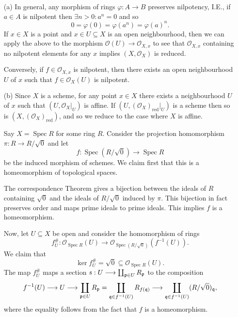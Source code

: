 \documentclass[12pt]{article}
\numberwithin{thm}{subsection}
\numberwithin{defn}{subsection}
\numberwithin{lemma}{subsection}
\numberwithin{example}{subsection}
\numberwithin{notation}{subsection}
\numberwithin{cor}{subsection}
\numberwithin{remark}{subsection}
\numberwithin{condition}{subsection}
\numberwithin{question}{subsection}
\numberwithin{construction}{subsection}
\numberwithin{construction}{subsection}
\numberwithin{construction}{subsection}
\newcommand{\lto}{\longrightarrow}
\begin{document}
\begin{enumerate}
    \item[(a)] In general, any morphism of rings $\varphi: A \lto B$ preserves nilpotency, I.E., if $a \in A$ is nilpotent then $\exists n >0: a^n = 0$ and so
    \begin{equation}
        0 = \varphi(0) = \varphi(a^n) = \varphi(a)^n.
    \end{equation}
    If $x \in X$ is a point and $x \in U \subseteq X$ is an open neighbourhood, then we can apply the above to the morphism $\mathcal{O}(U) \lto \mathcal{O}_{X,x}$ to see that $\mathcal{O}_{X,x}$ containing no nilpotent elements for any $x$ implies $(X, \mathcal{O}_X)$ is reduced.

    Conversely, if $f \in \mathcal{O}_{X,x}$ is nilpotent, then there exists an open neighbourhood $U$ of $x$ such that $f \in \mathcal{O}_X(U)$ is nilpotent.
    \item[(b)] Since $X$ is a scheme, for any point $x \in X$ there exists a neighbourhood $U$ of $x$ such that $(U, \mathcal{O}_X\vert_U)$ is affine. If $(U, (\mathcal{O}_X)_{\text{red}}\vert_U)$ is a scheme then so is $(X, (\mathcal{O}_X)_{\text{red}})$, and so we reduce to the case where $X$ is affine.

    Say $X = \operatorname{Spec}R$ for some ring $R$. Consider the projection homomorphism $\pi: R \lto R/\sqrt{0}$ and let
    \begin{equation}
        f: \operatorname{Spec}(R/\sqrt{0}) \lto \operatorname{Spec}R
    \end{equation}
    be the induced morphism of schemes. We claim first that this is a homeomorphism of topological spaces.

    The correspondence Theorem gives a bijection between the ideals of $R$ containing $\sqrt{0}$ and the ideals of $R/\sqrt{0}$ induced by $\pi$. This bijection in fact preserves order and maps prime ideals to prime ideals. This implies $f$ is a homeomorphism.

    Now, let $U \subseteq X$ be open and consider the homomorphism of rings
    \begin{equation}
        f^{\#}_U: \mathcal{O}_{\operatorname{Spec}R}(U) \lto \mathcal{O}_{\operatorname{Spec}(R/\sqrt{0})}(f^{-1}(U)).
    \end{equation}
    We claim that 
    \begin{equation}
        \ker f^{\#}_U = \sqrt{0} \subseteq \mathcal{O}_{\operatorname{Spec}R}(U).
    \end{equation}
    The map $f^{\#}_U$ maps a section $s: U \lto \coprod_{\frak{p} \in U}R_{\frak{p}}$ to the composition
    \begin{equation}
        f^{-1}(U) \lto U \lto \coprod_{\frak{p} \in U}R_{\frak{p}} = \coprod_{\frak{q} \in f^{-1}(U)}R_{f(\frak{q})} \lto \coprod_{\frak{q} \in f^{-1}(U)}(R/\sqrt{0})_{\frak{q}},
    \end{equation}
    where the equality follows from the fact that $f$ is a homeomorphism.


\end{enumerate}
\end{document}
